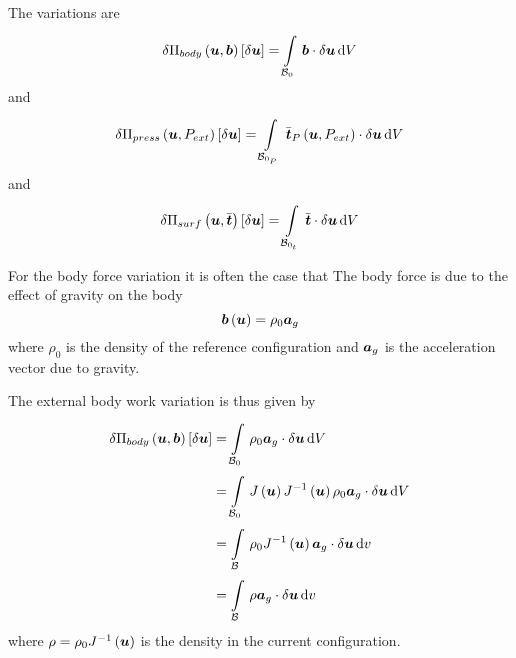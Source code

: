 The variations are
\begin{equation}
  \variation{\fnof{\Pi_{body}}{\vectr{u},\vectr{b}}}{\vectr{u}}=\gint{\embedmanifold{B}_{0}}{}{\dotprod{\vect{b}}{\variationdir{\vectr{u}}}}{V}
\end{equation}
and
\begin{equation}
  \variation{\fnof{\Pi_{press}}{\vectr{u},P_{ext}}}{\vectr{u}}=\gint{\embedmanifold{B}_{0_{P}}}{}{\dotprod{\fnof{\bar{\vect{t}}_{P}}{\vectr{u},P_{ext}}}{\variationdir{\vectr{u}}}}{V}
\end{equation}
and
\begin{equation}
  \variation{\fnof{\Pi_{surf}}{\vectr{u},\bar{\vectr{t}}}}{\vectr{u}}=\gint{\embedmanifold{B}_{0_{t}}}{}{\dotprod{\bar{\vect{t}}}{\variationdir{\vectr{u}}}}{V}
\end{equation}

For the body force variation it is often the case that The body force is due to the effect of gravity on the body \ie
\begin{equation}
    \boldsymbol{b} \left(  \boldsymbol{u}  \right) =\rho_{0} \boldsymbol{a} _{g}
\end{equation}
where $\rho_{0}$ is the density of the reference configuration and $ \boldsymbol{a} _{g}$ is
the acceleration vector due to gravity.

The external body work variation is thus given by
\begin{equation}
  \begin{split}
    \variation{\fnof{\Pi_{body}}{\vectr{u},\vectr{b}}}{\vectr{u}}
    &=\gint{\embedmanifold{B}_{0}}{}{\dotprod{\rho_{0}\vectr{a}_{g}}{\variationdir{\vectr{u}}}}{V} \\
    &=\gint{\embedmanifold{B}_{0}}{}{\dotprod{\fnof{J}{\vectr{u}}\fnof{\inverse{J}}{\vectr{u}}\rho_{0}\vectr{a}_{g}}{\variationdir{\vectr{u}}}}{V} \\
    &=\gint{\embedmanifold{B}}{}{\dotprod{\rho_{0}\fnof{\inverse{J}}{\vectr{u}}\vectr{a}_{g}}{\variationdir{\vectr{u}}}}{v} \\
    &=\gint{\embedmanifold{B}}{}{\dotprod{\rho\vectr{a}_{g}}{\variationdir{\vectr{u}}}}{v}
  \end{split}
\end{equation}
where $\rho=\rho_{0} {J}^{-1}\left(  \boldsymbol{u}  \right) $ is the density in the current configuration.

